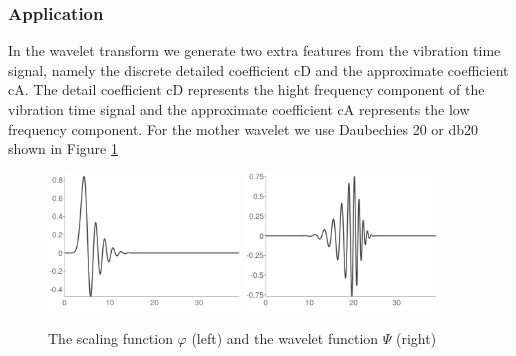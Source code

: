 \documentclass[11pt, oneside]{article}   	%
\begin{document}
\subsubsection{Application}
In the wavelet transform we generate two extra features from the vibration time signal, namely the discrete detailed coefficient cD and the approximate coefficient cA. The detail coefficient cD represents the hight frequency component of the vibration time signal and the approximate coefficient cA represents  
the low frequency component.  For the mother wavelet we use Daubechies 20 or db20 shown in Figure \ref{fig:wavelet}

\begin{figure}[H] %
   \centering
   \includegraphics[width=2in]{dbscaling}
    \includegraphics[width=2in]{dbwavelet}  
   \caption{The scaling function $\varphi$ (left) and the wavelet function $\Psi$ (right) }
   \label{fig:wavelet}
\end{figure}
\end{document}
